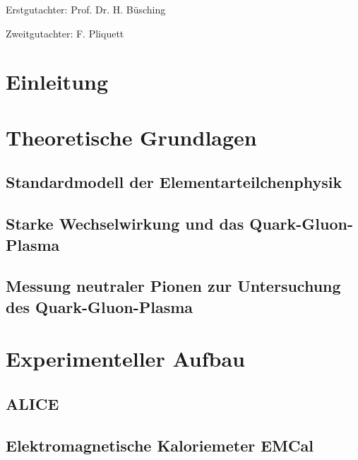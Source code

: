 \documentclass[11pt]{article}
\author{Marvin Hemmer}
\begin{document}
\begin{titlepage}
\begin{center}

\end{center}
\end{titlepage}
\newpage
\thispagestyle{empty}
\vspace*{\fill}
Erstgutachter: Prof. Dr. H. Büsching

Zweitgutachter: F. Pliquett
\newpage
\clearpage
\setcounter{page}{1}
\tableofcontents
\newpage

\section*{Einleitung}
\newpage
\section{Theoretische Grundlagen} \label{s1}

\subsection{Standardmodell der Elementarteilchenphysik} \label{s1s1}

\subsection{Starke Wechselwirkung und das Quark-Gluon-Plasma} \label{s1s2}

\subsection{Messung neutraler Pionen zur Untersuchung des Quark-Gluon-Plasma} \label{s1s3}

\newpage

\section{Experimenteller Aufbau} \label{s2}

\subsection{ALICE} \label{s2s1}

\subsection{Elektromagnetische Kaloriemeter EMCal} \label{s2s2}

\end{document}
